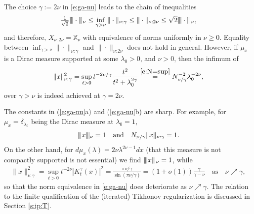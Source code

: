 \documentclass[10pt, a4paper]{iopart}
\newcommand{\IX}{\mathbb{X}}
\newcommand{\norm}[2]{     \| #1       \|_{ #2 }}
\newcommand{\normiii}[2]{\vert\kern-0.25ex\vert\kern-0.25ex\vert #1 \vert\kern-0.25ex \vert\kern-0.25ex\vert_{ #2 }}
\theoremstyle{remark}
\theoremstyle{definition}
\begin{document}

%

%
The choice $\gamma := 2 \nu$ in \eqref{e:ga-nu}
leads to the chain of inequalities
\begin{align}
\label{e:infg}
	\tfrac{1}{\sqrt{2}} \normiii{\cdot}{\nu}
	\leq
	\inf_{\gamma > \nu} \norm{\cdot}{\nu : \gamma}
	\leq
	\norm{\cdot}{\nu : 2 \nu}
	\leq
	\sqrt{2} \normiii{\cdot}{\nu}
	,
\end{align}
and therefore,
$X_{\nu : 2 \nu} = \IX_\nu$ 
with equivalence of norms uniformly in $\nu \geq 0$.
%
%
%
Equality between
$\inf_{\gamma > \nu} \norm{\cdot}{\nu : \gamma}$
and
$\norm{\cdot}{\nu : 2 \nu}$
does not hold in general.
%
However, 
if $\mu_x$ is a Dirac measure supported at some $\lambda_0 > 0$, 
and $\nu > 0$,
then the infimum of
\begin{align}
	\norm{x}{\nu : \gamma}^2
	=
	\sup_{t > 0}
	t^{-2 \nu/\gamma}
	\frac{t^2}{t^2 + \lambda_0^{2 \gamma}}
	\stackrel{\eqref{e:N=sup}}{=}
	N_{\nu / \gamma}^{-2}
	\lambda_0^{-2 \nu}
	,
\end{align}
over $\gamma > \nu$
is indeed achieved at $\gamma = 2 \nu$.

%

The constants in (\ref{e:ga-nu}a) and (\ref{e:ga-nu}b) are sharp.
%
For example,
for
$\mu_x = \delta_{\lambda_0}$ being the Dirac measure at $\lambda_0 = 1$,
\begin{align}
	\normiii{x}{\nu}
	=
	1
	\quad\text{and}\quad
	N_{\nu / \gamma}
	\norm{x}{\nu : \gamma}
	=
	1
	.
\end{align}
%
On the other hand,
for
$d \mu_x(\lambda) = 2 \nu \lambda^{2 \nu - 1} dx$
(that this measure is not compactly supported is not essential)
we find
$\normiii{x}{\nu} = 1$,
while
\begin{align}
	\norm{x}{\nu : \gamma}^2
	= 
	\sup_{t > 0} t^{-2\nu} |K_t^\gamma(x)|^2 = 
	\frac{\pi \nu / \gamma}{\sin(\pi \nu / \gamma)}
	=
	(1 + o(1))
	\frac{\gamma}{\gamma - \nu}
	\quad\text{as}\quad
	\nu \nearrow \gamma
	,
\end{align}
so that
the norm equivalence in \eqref{e:ga-nu}
does 
deteriorate
as $\nu \nearrow \gamma$.
%
The relation
to
the finite qualification of the (iterated) Tikhonov regularization
is discussed in
Section \ref{s:ip:T}.
%
\end{document}
